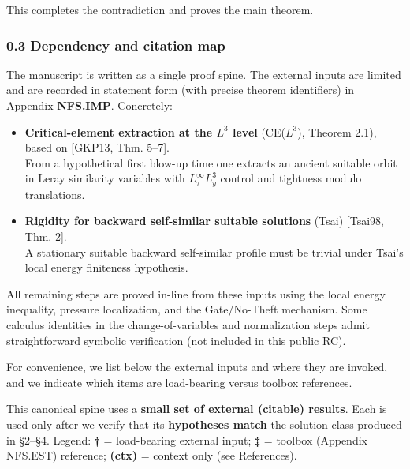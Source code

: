 \documentclass[
  11pt,
]{article}
\begin{document}
This completes the contradiction and proves the main theorem.

\hypertarget{dependency-and-citation-map}{%
\subsubsection{0.3 Dependency and citation map}\label{dependency-and-citation-map}}

The manuscript is written as a single proof spine. The external inputs are limited and are recorded in statement form (with precise theorem identifiers) in Appendix \textbf{NFS.IMP}. Concretely:

\begin{itemize}
\item
  \textbf{Critical-element extraction at the \(L^3\) level} (CE(\(L^3\)), Theorem 2.1), based on {[}GKP13, Thm. 5--7{]}.\\
  From a hypothetical first blow-up time one extracts an ancient suitable orbit in Leray similarity variables with \(L^\infty_\tau L^3_y\) control and tightness modulo translations.
\item
  \textbf{Rigidity for backward self-similar suitable solutions} (Tsai) {[}Tsai98, Thm. 2{]}.\\
  A stationary suitable backward self-similar profile must be trivial under Tsai's local energy finiteness hypothesis.
\end{itemize}

All remaining steps are proved in-line from these inputs using the local energy inequality, pressure localization, and the Gate/No-Theft mechanism. Some calculus identities in the change-of-variables and normalization steps admit straightforward symbolic verification (not included in this public RC).

For convenience, we list below the external inputs and where they are invoked, and we indicate which items are load-bearing versus toolbox references.

This canonical spine uses a \textbf{small set of external (citable) results}. Each is used only after we verify that its \textbf{hypotheses match} the solution class produced in §2--§4. Legend: \textbf{†} = load-bearing external input; \textbf{‡} = toolbox (Appendix NFS.EST) reference; \textbf{(ctx)} = context only (see References).
\end{document}

